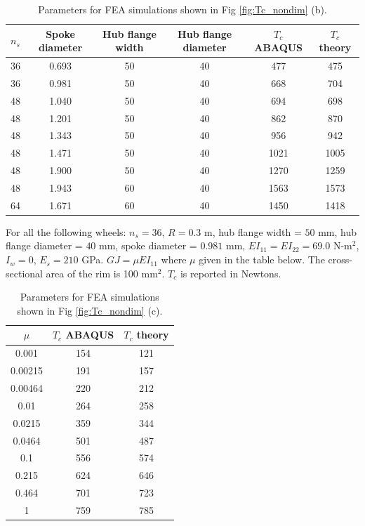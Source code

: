 \documentclass{bmd2016p}
\begin{document}
\begin{table}[ht!]
\caption{Parameters for FEA simulations shown in Fig \ref{fig:Tc_nondim} (b).}
\begin{tabular}{c|c|c|c|c|c}
\hline
$n_s$	& Spoke diameter	& Hub flange width	& Hub flange diameter	& $T_c$ ABAQUS	& $T_c$ theory\\
\hline
36		& 0.693				& 50				& 40					& 477			& 475\\
36		& 0.981				& 50				& 40					& 668			& 704\\
\hline
48		& 1.040				& 50				& 40					& 694			& 698\\
48		& 1.201				& 50				& 40					& 862			& 870\\
48		& 1.343				& 50				& 40					& 956			& 942\\
48		& 1.471				& 50				& 40					& 1021			& 1005\\
48		& 1.900				& 50				& 40					& 1270			& 1259\\
48		& 1.943				& 60				& 40					& 1563			& 1573\\
\hline
64		& 1.671				& 60				& 40					& 1450			& 1418\\
\hline
\end{tabular}
\end{table}

For all the following wheels: $n_s=36$, $R=0.3$ m, hub flange width = $50$ mm, hub flange diameter = $40$ mm, spoke diameter = $0.981$ mm, $EI_{11}=EI_{22}=69.0$ N-m$^2$, $I_w=0$, $E_s=210$ GPa. $GJ=\mu EI_{11}$ where $\mu$ given in the table below. The cross-sectional area of the rim is 100 mm$^2$. $T_c$ is reported in Newtons.

\begin{table}[ht!]
\centering
\caption{Parameters for FEA simulations shown in Fig \ref{fig:Tc_nondim} (c).}
\begin{tabular}{c|c|c}
\hline
$\mu$	& $T_c$ ABAQUS & $T_c$ theory\\
\hline
0.001	& 154	& 121 \\
0.00215	& 191	& 157 \\
0.00464	& 220	& 212 \\
0.01	& 264	& 258 \\
0.0215	& 359	& 344 \\
0.0464	& 501	& 487 \\
0.1		& 556	& 574 \\
0.215	& 624	& 646 \\
0.464	& 701	& 723 \\
1		& 759	& 785 \\
\hline
\end{tabular}
\end{table}
\end{document}
